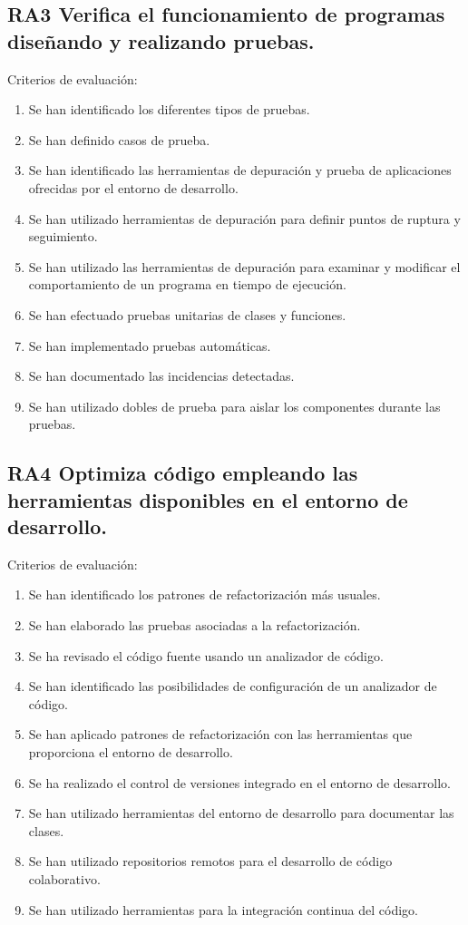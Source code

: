\documentclass[a4paper]{article}
\begin{document}
\subsection{RA3 Verifica el funcionamiento de programas diseñando y realizando pruebas.}
\label{sec:org000001e}
Criterios de evaluación:
\begin{enumerate}
\item Se han identificado los diferentes tipos de pruebas.
\item Se han definido casos de prueba.
\item Se han identificado las herramientas de depuración y prueba de aplicaciones ofrecidas por el entorno de desarrollo.
\item Se han utilizado herramientas de depuración para definir puntos de ruptura y seguimiento.
\item Se han utilizado las herramientas de depuración para examinar y modificar el comportamiento de un programa en tiempo de ejecución.
\item Se han efectuado pruebas unitarias de clases y funciones.
\item Se han implementado pruebas automáticas.
\item Se han documentado las incidencias detectadas.
\item Se han utilizado dobles de prueba para aislar los componentes durante las pruebas.
\end{enumerate}
\subsection{RA4 Optimiza código empleando las herramientas disponibles en el entorno de desarrollo.}
\label{sec:org0000021}
Criterios de evaluación:
\begin{enumerate}
\item Se han identificado los patrones de refactorización más usuales.
\item Se han elaborado las pruebas asociadas a la refactorización.
\item Se ha revisado el código fuente usando un analizador de código.
\item Se han identificado las posibilidades de configuración de un analizador de código.
\item Se han aplicado patrones de refactorización con las herramientas que proporciona el entorno de desarrollo.
\item Se ha realizado el control de versiones integrado en el entorno de desarrollo.
\item Se han utilizado herramientas del entorno de desarrollo para documentar las clases.
\item Se han utilizado repositorios remotos para el desarrollo de código colaborativo.
\item Se han utilizado herramientas para la integración continua del código.
\end{enumerate}
\end{document}
